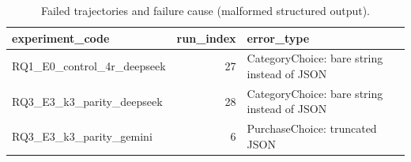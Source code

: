 \begin{table}[htbp]
\centering
\scriptsize
\caption{Failed trajectories and failure cause (malformed structured output).}
\label{tab:tab01a_failed_trajectories}
\begin{tabular}{lrl}
\toprule
experiment\_code & run\_index & error\_type \\
\midrule
RQ1\_E0\_control\_4r\_deepseek & 27 & CategoryChoice: bare string instead of JSON \\
RQ3\_E3\_k3\_parity\_deepseek & 28 & CategoryChoice: bare string instead of JSON \\
RQ3\_E3\_k3\_parity\_gemini & 6 & PurchaseChoice: truncated JSON \\
\bottomrule
\end{tabular}
\end{table}